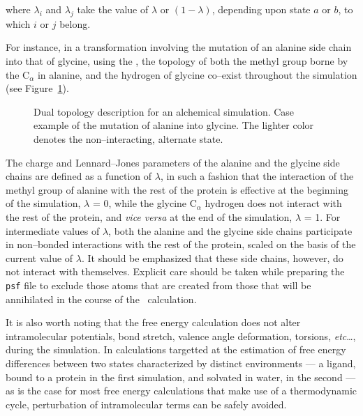 where $\lambda_i$ and $\lambda_j$ take the value of $\lambda$ or $(1-\lambda)$,
depending upon state $a$ or $b$, to which $i$ or $j$ belong.


For instance, in a transformation involving the mutation of an
alanine side chain into that of glycine, using the \FEP, the topology
of both the methyl group borne by the C$_\alpha$ in alanine,
and the hydrogen of glycine co--exist throughout the simulation
(see Figure~\ref{fig:dual_top}).


\begin{figure}[ht]
  \caption{Dual topology description for an alchemical simulation.
         Case example of the mutation of alanine into glycine.
         The lighter color denotes the non--interacting, alternate
         state.}
  \label{fig:dual_top}
\end{figure}


The charge and Lennard--Jones parameters of the alanine and
the glycine side chains
are defined as a function of $\lambda$, in such a fashion that 
the interaction of the methyl group of alanine with the rest of 
the protein is effective at the beginning of the simulation,
\ie $\lambda$ = 0, while
the glycine C$_\alpha$ hydrogen does not interact with the rest
of the protein, and {\it vice versa} at the end of the
simulation, \ie $\lambda$ = 1.
For intermediate values of $\lambda$, both the alanine and the glycine
side chains participate in non--bonded interactions with the rest 
of the protein, scaled on the basis of the current value of $\lambda$.
It should be emphasized that these side chains, however,
do not interact with themselves. Explicit care should be taken while
preparing the {\tt psf} file to exclude those atoms that are created
from those that will be annihilated in the course of the
\FEP\ calculation.


It is also worth noting that
the free energy calculation does not alter intramolecular
potentials, \ie bond stretch, valence angle deformation, torsions,
{\it etc}\dots, during
the simulation. In calculations targetted at the estimation
of free energy differences between two states characterized by
distinct environments --- \eg a ligand, bound to a protein in
the first simulation,
and solvated in water, in the second --- as is the 
case for most free energy calculations that make use of a thermodynamic 
cycle, perturbation of intramolecular terms can be safely
avoided.~\cite{Boresch.99a}


